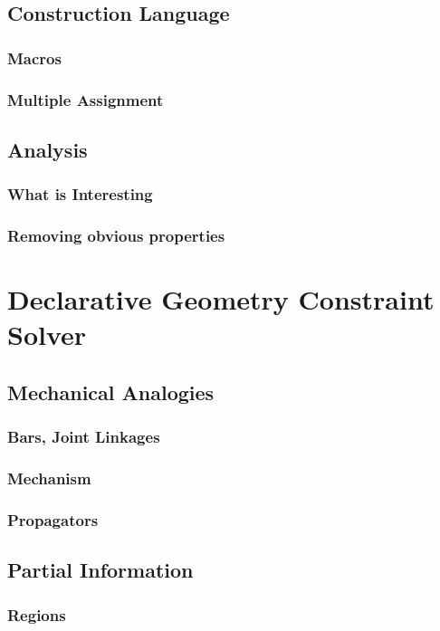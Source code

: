\documentclass[11pt]{article}
\begin{document}
\subsection{Construction Language}
\label{sec-3-5}
\subsubsection{Macros}
\label{sec-3-5-1}
\subsubsection{Multiple Assignment}
\label{sec-3-5-2}
\subsection{Analysis}
\label{sec-3-6}
\subsubsection{What is Interesting}
\label{sec-3-6-1}
\subsubsection{Removing obvious properties}
\label{sec-3-6-2}
\section{Declarative Geometry Constraint Solver}
\label{sec-4}
\subsection{Mechanical Analogies}
\label{sec-4-1}
\subsubsection{Bars, Joint Linkages}
\label{sec-4-1-1}
\subsubsection{Mechanism}
\label{sec-4-1-2}
\subsubsection{Propagators}
\label{sec-4-1-3}
\subsection{Partial Information}
\label{sec-4-2}
\subsubsection{Regions}
\label{sec-4-2-1}
\end{document}
